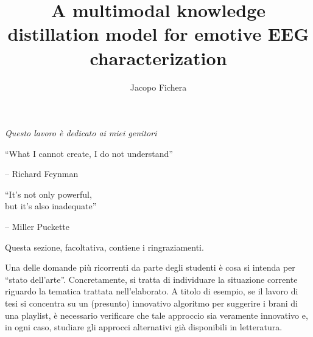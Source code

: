 \documentclass[12pt]{report}
\title{A multimodal knowledge distillation model for emotive EEG characterization}
\author{Jacopo Fichera}
\begin{document}
    \makefrontpage

%
%

    {\raggedleft \large \sl Questo lavoro \`{e} dedicato ai miei genitori\\

    \vspace{2cm}

    ``What I cannot create, I do not understand''

    \bigskip

    \--- Richard Feynman\\

    \vspace{2cm}

    ``It's not only powerful,\\but it's also inadequate''

    \bigskip

    \--- Miller Puckette\\}

    \clearpage
    \beforepreface

%
%


%
%

    Questa sezione, facoltativa, contiene i ringraziamenti.

%
%

    \afterpreface

%
%

    
%
%

    

    Una delle domande più ricorrenti da parte degli studenti \`e cosa si intenda per ``stato dell'arte''. Concretamente, si tratta di individuare la situazione corrente riguardo la tematica trattata nell'elaborato. A titolo di esempio, se il lavoro di tesi si concentra su un (presunto) innovativo algoritmo per suggerire i brani di una playlist, è necessario verificare che tale approccio sia veramente innovativo e, in ogni caso, studiare gli approcci alternativi già disponibili in letteratura.
\end{document}
